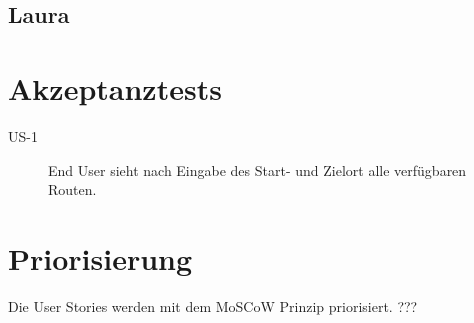 \newpage{}
\subsection{Laura}


\section{Akzeptanztests}

\begin{description}
\item[US-1] End User sieht nach Eingabe des Start- und Zielort alle verfügbaren Routen.
\end{description}


\section{Priorisierung}
Die User Stories werden mit dem MoSCoW Prinzip priorisiert.
???



